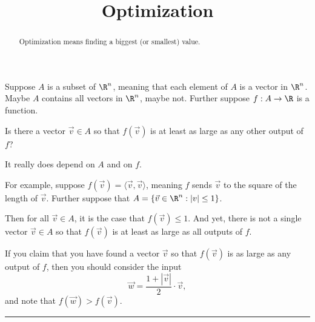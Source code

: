 \documentclass{ximera}
\title{Optimization}
\begin{document}
\begin{abstract}
  Optimization means finding a biggest (or smallest) value.
\end{abstract}

Suppose $A$ is a subset of $\R^n$, meaning that each element of $A$ is
a vector in $\R^n$.  Maybe $A$ contains all vectors in $\R^n$, maybe
not.  Further suppose $f : A \to \R$ is a function.

\begin{question}
  Is there a vector $\vec{v} \in A$ so that $f(\vec{v})$ is at least
  as large as any other output of $f$?

  \begin{solution}
    \begin{multiple-choice}
    \end{multiple-choice}
  \end{solution}

  It really does depend on $A$ and on $f$.

  For example, suppose $f(\vec{v}) = \langle \vec{v}, \vec{v}
  \rangle$, meaning $f$ sends $\vec{v}$ to the square of the length of
  $\vec{v}$.  Further suppose that $A = \{ \vec{v} \in \R^n : |v| \le
  1 \}$.

  Then for all $\vec{v} \in A$, it is the case that $f(\vec{v}) \le
  1$.  And yet, there is not a single vector $\vec{v} \in A$ so that
  $f(\vec{v})$ is at least as large as all outputs of $f$.

  If you claim that you have found a vector $\vec{v}$ so that
  $f(\vec{v})$ is as large as any output of $f$, then you should consider the input
  $$
  \vec{w} = \frac{1 + |\vec{v}|}{2} \cdot \vec{v},
  $$
  and note that $f(\vec{w}) \gt f(\vec{v})$.
\end{question}

\hrule
\end{document}
